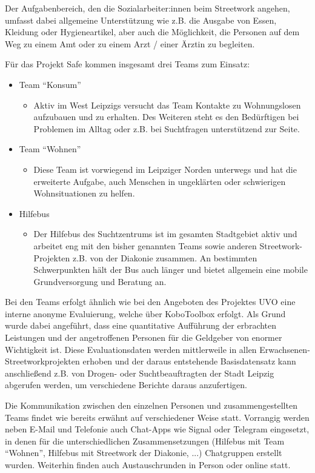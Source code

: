 Der Aufgabenbereich, den die Sozialarbeiter:innen beim Streetwork angehen, umfasst dabei allgemeine Unterstützung wie z.B. die Ausgabe von Essen, Kleidung oder Hygieneartikel, aber auch die Möglichkeit, die Personen auf dem Weg zu einem Amt oder zu einem Arzt / einer Ärztin zu begleiten.

Für das Projekt \ac{Safe} kommen insgesamt drei Teams zum Einsatz:
\begin{itemize}
	\item Team \enquote{Konsum}
	\begin{itemize}
		\item[] Aktiv im West Leipzigs versucht das Team Kontakte zu Wohnungslosen aufzubauen und zu erhalten. Des Weiteren steht es den Bedürftigen bei Problemen im Alltag oder z.B. bei Suchtfragen unterstützend zur Seite.
	\end{itemize}
	\item Team \enquote{Wohnen}
	\begin{itemize}
		\item[] Diese Team ist vorwiegend im Leipziger Norden unterwegs und hat die erweiterte Aufgabe, auch Menschen in ungeklärten oder schwierigen Wohnsituationen zu helfen.
	\end{itemize}
	\item Hilfebus
	\begin{itemize}
		\item[] Der Hilfebus des Suchtzentrums ist im gesamten Stadtgebiet aktiv und arbeitet eng mit den bisher genannten Teams sowie anderen Streetwork-Projekten z.B. von der Diakonie zusammen. An bestimmten Schwerpunkten hält der Bus auch länger und bietet allgemein eine mobile Grundversorgung und Beratung an.
	\end{itemize}
\end{itemize}

Bei den Teams erfolgt ähnlich wie bei den Angeboten des Projektes \acs{UVO} eine interne anonyme Evaluierung, welche über KoboToolbox erfolgt. Als Grund wurde dabei angeführt, dass eine quantitative Aufführung der erbrachten Leistungen und der angetroffenen Personen für die Geldgeber von enormer Wichtigkeit ist. Diese Evaluationsdaten werden mittlerweile in allen Erwachsenen-Streetworkprojekten erhoben und der daraus entstehende Basisdatensatz kann anschließend z.B. von Drogen- oder Suchtbeauftragten der Stadt Leipzig abgerufen werden, um verschiedene Berichte daraus anzufertigen.

Die Kommunikation zwischen den einzelnen Personen und zusammengestellten Teams findet wie bereits erwähnt auf verschiedener Weise statt. Vorrangig werden neben E-Mail und Telefonie auch Chat-Apps wie Signal oder Telegram eingesetzt, in denen für die unterschiedlichen Zusammensetzungen (Hilfebus mit Team \enquote{Wohnen}, Hilfebus mit Streetwork der Diakonie, ...) Chatgruppen erstellt wurden. Weiterhin finden auch Austauschrunden in Person oder online statt.

